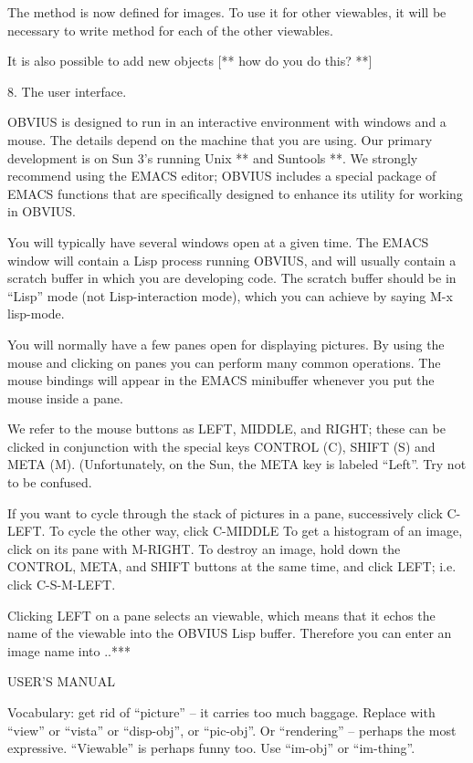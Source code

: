 The method is now defined for images.  To use it for other
viewables, it will be necessary to write method for each of the
other viewables.

It is also possible to add new objects [** how do you do this? **]


8. The user interface.

OBVIUS is designed to run in an interactive environment with windows
and a mouse.  The details depend on the machine that you are using.
Our primary development is on Sun 3's running Unix ** and Suntools **.
We strongly recommend using the
EMACS editor; OBVIUS includes a special package of EMACS
functions that are specifically designed to enhance its utility
for working in OBVIUS.

You will typically have several windows open at a given time.
The EMACS window will contain a Lisp process running OBVIUS,
and will usually contain a scratch buffer in which you are developing code.
The scratch buffer should be in ``Lisp'' mode (not Lisp-interaction mode),
which you can achieve by saying M-x lisp-mode.

You will normally have a few panes open for displaying pictures.
By using the mouse and clicking on panes you can perform many common
operations.  The mouse bindings will
appear in the EMACS minibuffer whenever you put the mouse inside a pane.

We refer to the mouse buttons as LEFT, MIDDLE, and RIGHT; these can be
clicked in conjunction with the special keys CONTROL (C), SHIFT (S)
and META (M). (Unfortunately, on the Sun, the META key is labeled
``Left''.  Try not to be confused.

If you want to cycle through the stack of pictures in a pane,
successively click C-LEFT.  To cycle the other way, click C-MIDDLE
To get a histogram of an image, click on its pane with M-RIGHT.
To destroy an image, hold down the CONTROL, META, and SHIFT
buttons at the same time, and click LEFT; i.e. click C-S-M-LEFT.

Clicking LEFT on a pane selects an viewable, which means that it echos
the name of the viewable into the OBVIUS Lisp buffer.  Therefore
you can enter an image name into ..***


USER'S MANUAL

Vocabulary: get rid of ``picture'' -- it carries too much baggage.
Replace with ``view'' or ``vista'' or ``disp-obj'', or ``pic-obj''.
Or ``rendering'' -- perhaps the most expressive.
``Viewable'' is perhaps funny too.  Use ``im-obj'' or ``im-thing''.

